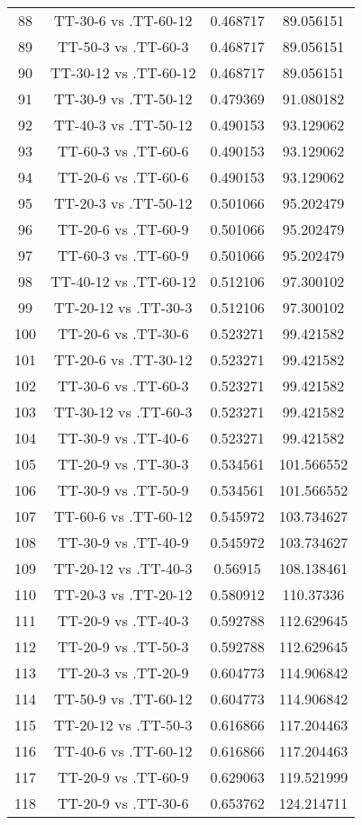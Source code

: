 \documentclass[a4paper,10pt]{article}
\begin{document}
\begin{landscape}
\begin{table}[!htp]
\begin{tabular}{cccc}
88&TT-30-6 vs .TT-60-12&0.468717&89.056151\\
89&TT-50-3 vs .TT-60-3&0.468717&89.056151\\
90&TT-30-12 vs .TT-60-12&0.468717&89.056151\\
91&TT-30-9 vs .TT-50-12&0.479369&91.080182\\
92&TT-40-3 vs .TT-50-12&0.490153&93.129062\\
93&TT-60-3 vs .TT-60-6&0.490153&93.129062\\
94&TT-20-6 vs .TT-60-6&0.490153&93.129062\\
95&TT-20-3 vs .TT-50-12&0.501066&95.202479\\
96&TT-20-6 vs .TT-60-9&0.501066&95.202479\\
97&TT-60-3 vs .TT-60-9&0.501066&95.202479\\
98&TT-40-12 vs .TT-60-12&0.512106&97.300102\\
99&TT-20-12 vs .TT-30-3&0.512106&97.300102\\
100&TT-20-6 vs .TT-30-6&0.523271&99.421582\\
101&TT-20-6 vs .TT-30-12&0.523271&99.421582\\
102&TT-30-6 vs .TT-60-3&0.523271&99.421582\\
103&TT-30-12 vs .TT-60-3&0.523271&99.421582\\
104&TT-30-9 vs .TT-40-6&0.523271&99.421582\\
105&TT-20-9 vs .TT-30-3&0.534561&101.566552\\
106&TT-30-9 vs .TT-50-9&0.534561&101.566552\\
107&TT-60-6 vs .TT-60-12&0.545972&103.734627\\
108&TT-30-9 vs .TT-40-9&0.545972&103.734627\\
109&TT-20-12 vs .TT-40-3&0.56915&108.138461\\
110&TT-20-3 vs .TT-20-12&0.580912&110.37336\\
111&TT-20-9 vs .TT-40-3&0.592788&112.629645\\
112&TT-20-9 vs .TT-50-3&0.592788&112.629645\\
113&TT-20-3 vs .TT-20-9&0.604773&114.906842\\
114&TT-50-9 vs .TT-60-12&0.604773&114.906842\\
115&TT-20-12 vs .TT-50-3&0.616866&117.204463\\
116&TT-40-6 vs .TT-60-12&0.616866&117.204463\\
117&TT-20-9 vs .TT-60-9&0.629063&119.521999\\
118&TT-20-9 vs .TT-30-6&0.653762&124.214711\\

\end{tabular}
\end{table}
\end{landscape}
\end{document}
